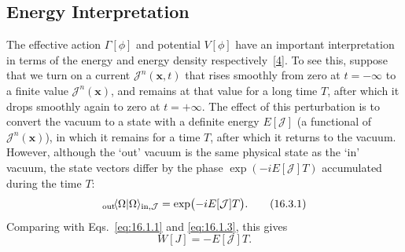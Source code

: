 \subsection{Energy Interpretation}

The effective action $\Gamma[\phi]$ and potential $V[\phi]$ have an important interpretation in terms of the energy and energy density respectively~\hyperref[ch16-ref-4]{[4]}. To see this, suppose that we turn on a current $\mathcal J^n(\mathbf{x},t)$ that rises smoothly from zero at $t=-\infty$ to a finite value $\mathcal J^n(\mathbf{x})$, and remains at that value for a long time $T$, after which it drops smoothly again to zero at $t=+\infty$. The effect of this perturbation is to convert the vacuum to a state with a definite energy $E[\mathcal J]$ (a functional of $\mathcal J^n(\mathbf{x})$), in which it remains for a time $T$, after which it returns to the vacuum. However, although the `out' vacuum is the same physical state as the `in' vacuum, the state vectors differ by the phase $\exp(-iE[\mathcal J]T)$ accumulated during the time $T$:
\begin{equation}
{}_{\mathrm{out}}\!\langle \Omega\vert \Omega\rangle_{\mathrm{in},\mathcal J}
=\exp\bigl(-iE[\mathcal J]T\bigr).
\tag{16.3.1}\label{eq:16.3.1}
\end{equation}
Comparing with Eqs.~\eqref{eq:16.1.1} and \eqref{eq:16.1.3}, this gives
\begin{equation}
W[J]=-E[\mathcal J]T.
\tag{16.3.2}\label{eq:16.3.2}
\end{equation}

